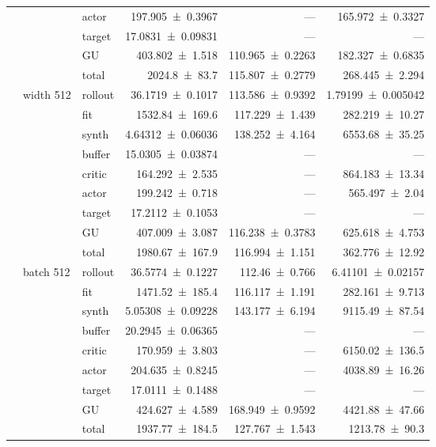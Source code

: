 {\begin{longtable}{@{}lllrrr@{}}
     &  & actor & \num{197.905+-0.3967} & --- & \num{165.972+-0.3327} \\
     &  & target & \num{17.0831+-0.09831} & --- & --- \\
     &  & GU & \num{403.802+-1.518} & \num{110.965+-0.2263} & \num{182.327+-0.6835} \\
     &  & total & \num{2024.8+-83.7} & \num{115.807+-0.2779} & \num{268.445+-2.294} \\
    \addlinespace[2pt]
     & width 512 & rollout & \num{36.1719+-0.1017} & \num{113.586+-0.9392} & \num{1.79199+-0.005042} \\
     &  & fit & \num{1532.84+-169.6} & \num{117.229+-1.439} & \num{282.219+-10.27} \\
     &  & synth & \num{4.64312+-0.06036} & \num{138.252+-4.164} & \num{6553.68+-35.25} \\
     &  & buffer & \num{15.0305+-0.03874} & --- & --- \\
     &  & critic & \num{164.292+-2.535} & --- & \num{864.183+-13.34} \\
     &  & actor & \num{199.242+-0.718} & --- & \num{565.497+-2.04} \\
     &  & target & \num{17.2112+-0.1053} & --- & --- \\
     &  & GU & \num{407.009+-3.087} & \num{116.238+-0.3783} & \num{625.618+-4.753} \\
     &  & total & \num{1980.67+-167.9} & \num{116.994+-1.151} & \num{362.776+-12.92} \\
    \addlinespace[2pt]
     & batch 512 & rollout & \num{36.5774+-0.1227} & \num{112.46+-0.766} & \num{6.41101+-0.02157} \\
     &  & fit & \num{1471.52+-185.4} & \num{116.117+-1.191} & \num{282.161+-9.713} \\
     &  & synth & \num{5.05308+-0.09228} & \num{143.177+-6.194} & \num{9115.49+-87.54} \\
     &  & buffer & \num{20.2945+-0.06365} & --- & --- \\
     &  & critic & \num{170.959+-3.803} & --- & \num{6150.02+-136.5} \\
     &  & actor & \num{204.635+-0.8245} & --- & \num{4038.89+-16.26} \\
     &  & target & \num{17.0111+-0.1488} & --- & --- \\
     &  & GU & \num{424.627+-4.589} & \num{168.949+-0.9592} & \num{4421.88+-47.66} \\
     &  & total & \num{1937.77+-184.5} & \num{127.767+-1.543} & \num{1213.78+-90.3} \\

\end{longtable}}
